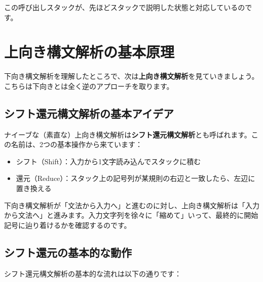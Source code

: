この呼び出しスタックが、先ほどスタックで説明した状態と対応しているのです。

\hypertarget{chapter5-ux4e0aux5411ux304dux69cbux6587ux89e3ux6790ux306eux57faux672cux539fux7406}{%
\section{上向き構文解析の基本原理}\label{chapter5-ux4e0aux5411ux304dux69cbux6587ux89e3ux6790ux306eux57faux672cux539fux7406}}

下向き構文解析を理解したところで、次は\textbf{上向き構文解析}を見ていきましょう。こちらは下向きとは全く逆のアプローチを取ります。

\hypertarget{chapter5-ux30b7ux30d5ux30c8ux9084ux5143ux69cbux6587ux89e3ux6790ux306eux57faux672cux30a2ux30a4ux30c7ux30a2}{%
\subsection{シフト還元構文解析の基本アイデア}\label{chapter5-ux30b7ux30d5ux30c8ux9084ux5143ux69cbux6587ux89e3ux6790ux306eux57faux672cux30a2ux30a4ux30c7ux30a2}}

ナイーブな（素直な）上向き構文解析は\textbf{シフト還元構文解析}とも呼ばれます。この名前は、2つの基本操作から来ています：

\begin{itemize}
\tightlist
\item
  シフト（Shift）：入力から1文字読み込んでスタックに積む
\item
  還元（Reduce）：スタック上の記号列が某規則の右辺と一致したら、左辺に置き換える
\end{itemize}

下向き構文解析が「文法から入力へ」と進むのに対し、上向き構文解析は「入力から文法へ」と進みます。入力文字列を徐々に「縮めて」いって、最終的に開始記号に辿り着けるかを確認するのです。

\hypertarget{chapter5-ux30b7ux30d5ux30c8ux9084ux5143ux306eux57faux672cux7684ux306aux52d5ux4f5c}{%
\subsection{シフト還元の基本的な動作}\label{chapter5-ux30b7ux30d5ux30c8ux9084ux5143ux306eux57faux672cux7684ux306aux52d5ux4f5c}}

シフト還元構文解析の基本的な流れは以下の通りです：

